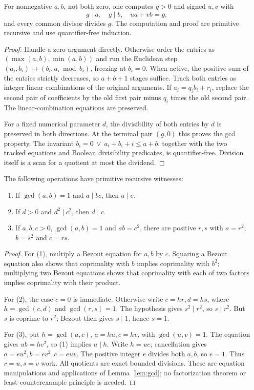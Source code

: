 \begin{lemma}\label{lem:gcd}
For nonnegative $a,b$, not both zero, one computes $g>0$ and signed
$u,v$ with
\[
g\mid a,\quad g\mid b,\quad ua+vb=g,
\]
and every common divisor divides $g$. The computation and proof are
primitive recursive and use quantifier-free induction.
\end{lemma}
\begin{proof}
Handle a zero argument directly. Otherwise order the entries as
$(\max(a,b),\min(a,b))$ and run the Euclidean step
$(a_i,b_i)\mapsto(b_i,a_i\bmod b_i)$, freezing at $b_i=0$.
When active, the positive sum of the entries strictly decreases, so
$a+b+1$ stages suffice. Track both entries as integer linear combinations
of the original arguments. If $a_i=q_ib_i+r_i$, replace the second pair
of coefficients by the old first pair minus $q_i$ times the old second
pair. The linear-combination equations are preserved.

For a fixed numerical parameter $d$, the divisibility of both entries by
$d$ is preserved in both directions. At the terminal pair $(g,0)$ this
proves the gcd property. The invariant
$b_i=0\ \vee\ a_i+b_i+i\le a+b$, together with the two tracked equations
and Boolean divisibility predicates, is quantifier-free. Division itself
is a scan for a quotient at most the dividend.
\end{proof}

\begin{lemma}\label{lem:squares}
The following operations have primitive recursive witnesses:
\begin{enumerate}
\item If $\gcd(a,b)=1$ and $a\mid bc$, then $a\mid c$.
\item If $d>0$ and $d^2\mid c^2$, then $d\mid c$.
\item If $a,b,c>0$, $\gcd(a,b)=1$ and $ab=c^2$, there are positive
$r,s$ with $a=r^2$, $b=s^2$ and $c=rs$.
\end{enumerate}
\end{lemma}
\begin{proof}
For (1), multiply a Bezout equation for $a,b$ by $c$.
Squaring a Bezout equation also shows that coprimality with $b$ implies
coprimality with $b^2$; multiplying two Bezout equations shows that
coprimality with each of two factors implies coprimality with their product.

For (2), the case $c=0$ is immediate. Otherwise write
$c=hr,d=hs$, where $h=\gcd(c,d)$ and $\gcd(r,s)=1$.
The hypothesis gives $s^2\mid r^2$, so $s\mid r^2$.
But $s$ is coprime to $r^2$; Bezout then gives $s\mid1$, hence $s=1$.

For (3), put $h=\gcd(a,c)$, $a=hu,c=hv$, with $\gcd(u,v)=1$.
The equation gives $ub=hv^2$, so (1) implies $u\mid h$.
Write $h=ue$; cancellation gives
$a=eu^2,b=ev^2,c=euv$. The positive integer $e$ divides both $a,b$,
so $e=1$. Thus $r=u,s=v$ work. All quotients are exact bounded divisions.
These are equation manipulations and applications of Lemma~\ref{lem:gcd};
no factorization theorem or least-counterexample principle is needed.
\end{proof}

